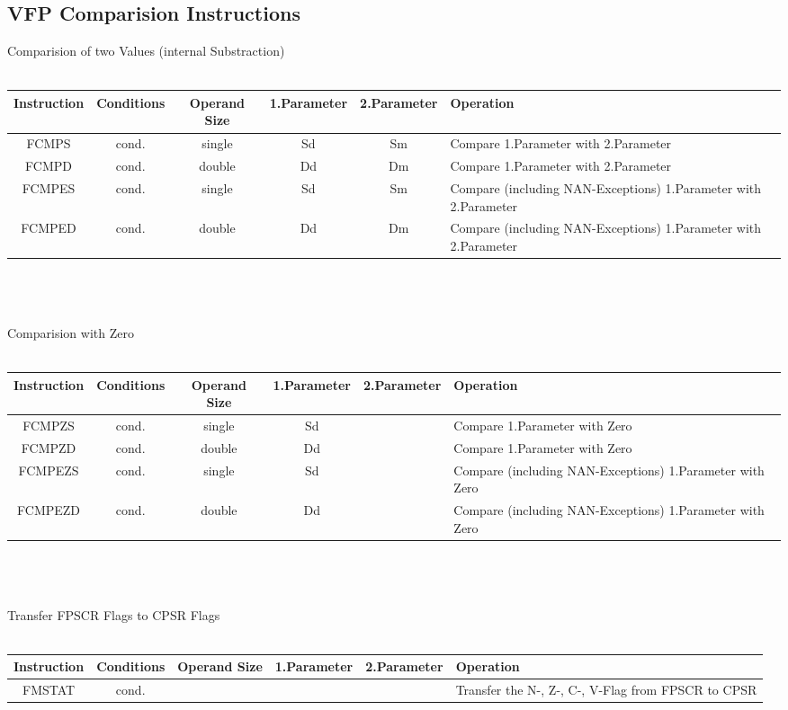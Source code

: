 \begin{landscape}
\section{VFP Comparision Instructions}
{\rot Comparision of two Values (internal Substraction)}\\
\\
\begin{tabular}{|c|c|c|c|c|l|}
\hline
Instruction & Conditions & Operand Size & 1.Parameter & 2.Parameter & Operation\\
\hline
FCMPS & cond. & single  & Sd & Sm & Compare 1.Parameter with 2.Parameter\\
\hline
FCMPD & cond. & double  & Dd & Dm & Compare 1.Parameter with 2.Parameter\\
\hline
FCMPES & cond. & single  & Sd & Sm & Compare (including NAN-Exceptions) 1.Parameter with 2.Parameter\\
\hline
FCMPED & cond. & double  & Dd & Dm & Compare (including NAN-Exceptions) 1.Parameter with 2.Parameter\\
\hline
\end{tabular}\\
\\
\\
{\rot Comparision with Zero}\\
\\
\begin{tabular}{|c|c|c|c|c|l|}
\hline
Instruction & Conditions & Operand Size & 1.Parameter & 2.Parameter & Operation\\
\hline
FCMPZS & cond. & single  & Sd &  & Compare 1.Parameter with Zero\\
\hline
FCMPZD & cond. & double  & Dd &  & Compare 1.Parameter with Zero\\
\hline
FCMPEZS & cond. & single  & Sd &  & Compare (including NAN-Exceptions) 1.Parameter with Zero\\
\hline
FCMPEZD & cond. & double  & Dd &  & Compare (including NAN-Exceptions) 1.Parameter with Zero\\
\hline
\end{tabular}\\
\\
\\
{\rot Transfer FPSCR Flags to CPSR Flags}\\
\\
\begin{tabular}{|c|c|c|c|c|l|}
\hline
Instruction & Conditions & Operand Size & 1.Parameter & 2.Parameter & Operation\\
\hline
FMSTAT & cond. &  &  &  & Transfer the N-, Z-, C-, V-Flag from FPSCR to CPSR\\
\hline
\end{tabular}\\
\\
\\

\end{landscape}



